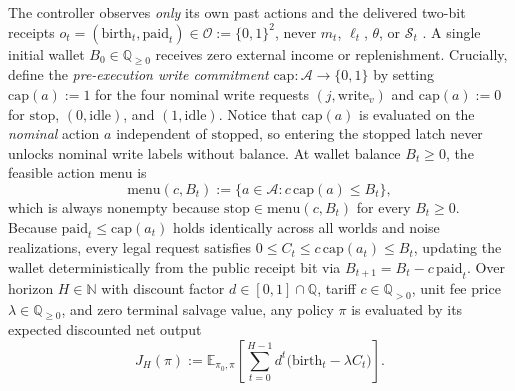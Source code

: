 \documentclass[11pt,letterpaper]{article}
\newcounter{none}
\begin{document}
The controller observes \emph{only} its own past actions and the
delivered two-bit receipts
\(o_t = (\mathrm{birth}_t, \mathrm{paid}_t) \in \mathcal{O} := \{0,1\}^2\),
never \(m_t\), \(\ell_t\), \(\theta\), or \(\mathcal{S}_t\)
\citep{astrom1965, smallwoodSondik1973, krishnamurthy2016}. A single
initial wallet \(B_0 \in \mathbb{Q}_{\ge 0}\) receives zero external
income or replenishment. Crucially, define the \emph{pre-execution write
commitment} \(\mathrm{cap}: \mathcal{A} \to \{0,1\}\) by setting
\(\mathrm{cap}(a) := 1\) for the four nominal write requests
\((j, \mathrm{write}_v)\) and \(\mathrm{cap}(a) := 0\) for
\(\mathrm{stop}\), \((0, \mathrm{idle})\), and \((1, \mathrm{idle})\).
Notice that \(\mathrm{cap}(a)\) is evaluated on the \emph{nominal}
action \(a\) independent of \(\mathrm{stopped}\), so entering the
stopped latch never unlocks nominal write labels without balance. At
wallet balance \(B_t \ge 0\), the feasible action menu is
\[\mathrm{menu}(c, B_t) := \bigl\{a \in \mathcal{A} : c\,\mathrm{cap}(a) \le B_t\bigr\},\]
which is always nonempty because
\(\mathrm{stop} \in \mathrm{menu}(c, B_t)\) for every \(B_t \ge 0\).
Because \(\mathrm{paid}_t \le \mathrm{cap}(a_t)\) holds identically
across all worlds and noise realizations, every legal request satisfies
\(0 \le C_t \le c\,\mathrm{cap}(a_t) \le B_t\), updating the wallet
deterministically from the public receipt bit via
\(B_{t+1} = B_t - c\,\mathrm{paid}_t\). Over horizon
\(H \in \mathbb{N}\) with discount factor
\(d \in [0,1] \cap \mathbb{Q}\), tariff \(c \in \mathbb{Q}_{>0}\), unit
fee price \(\lambda \in \mathbb{Q}_{\ge 0}\), and zero terminal salvage
value, any policy \(\pi\) is evaluated by its expected discounted net
output
\[J_H(\pi) := \mathbb{E}_{\pi_0, \pi}\!\left[\sum_{t=0}^{H-1} d^t \bigl(\mathrm{birth}_t - \lambda C_t\bigr)\right].\]
\end{document}
